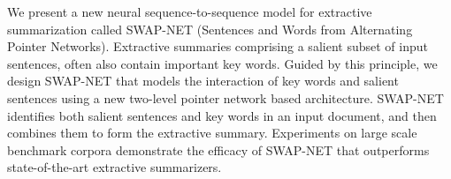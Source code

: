 We present a new neural sequence-to-sequence model for extractive summarization called SWAP-NET (Sentences and Words from Alternating Pointer Networks). Extractive summaries comprising a salient subset of input sentences, often also contain important key words. Guided by this principle, we design SWAP-NET that models the interaction of key words and salient sentences using a new two-level pointer network based architecture. SWAP-NET identifies both salient sentences and key words in an input document, and then combines them to form the extractive summary. Experiments on large scale benchmark corpora demonstrate the efficacy of SWAP-NET that outperforms state-of-the-art extractive summarizers.
